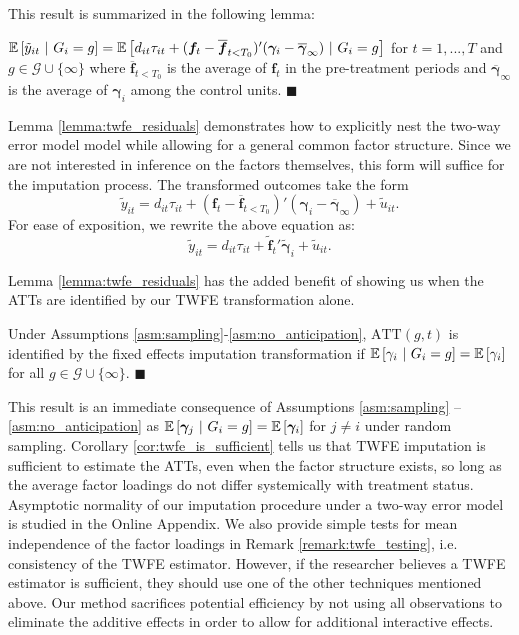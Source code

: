 \documentclass[12pt]{article}
\def\ATT{\text{ATT}}
\begin{document}
This result is summarized in the following lemma:
\begin{lemma}\label{lemma:twfe_residuals}
  $\mathbb{E}\left[\tilde{y}_{it} \ \vert \ G_i = g\right] = \mathbb{E}\left[d_{it}\tau_{it} + (\bm f_t - \overline{\bm f}_{t < T_0})' (\bm \gamma_i - \overline{\bm \gamma}_{\infty})  \ \vert \ G_i = g\right]$ for $t = 1,...,T$ and $g \in \mathcal{G} \cup \{ \infty \}$ where $\overline{\bm f}_{t < T_0}$ is the average of $\bm f_t$ in the pre-treatment periods and $\overline{\bm\gamma}_\infty$ is the average of $\bm \gamma_i$ among the control units. $\blacksquare$
\end{lemma}

Lemma \ref{lemma:twfe_residuals} demonstrates how to explicitly nest the two-way error model model while allowing for a general common factor structure. Since we are not interested in inference on the factors themselves, this form will suffice for the imputation process. The transformed outcomes take the form
\begin{equation}
  \tilde{y}_{it} = d_{it} \tau_{it} + (\bm f_t - \overline{\bm f}_{t < T_0})' (\bm \gamma_i - \overline{\bm \gamma}_\infty) + \tilde{u}_{it}.
\end{equation}
For ease of exposition, we rewrite the above equation as:
\begin{equation}
  \tilde{y}_{it} = d_{it} \tau_{it} + \tilde{\bm f}_t' \tilde{\bm \gamma}_i + \tilde{u}_{it}.
\end{equation}

Lemma \ref{lemma:twfe_residuals} has the added benefit of showing us when the ATTs are identified by our TWFE transformation alone.
\begin{cor}\label{cor:twfe_is_sufficient}
  Under Assumptions \ref{asm:sampling}-\ref{asm:no_anticipation}, $\ATT(g,t)$ is identified by the fixed effects imputation transformation if $\mathbb{E}\left[\gamma_i \ \vert \ G_i=g\right] = \mathbb{E}\left[\gamma_i\right]$ for all $g \in \mathcal{G} \cup \{\infty\}$. $\blacksquare$
\end{cor}
This result is an immediate consequence of Assumptions \ref{asm:sampling} -- \ref{asm:no_anticipation} as $\mathbb{E}\left[\bm \gamma_j \ \vert \ G_i = g\right] = \mathbb{E}\left[\bm \gamma_i\right]$ for $j \neq i$ under random sampling. 
Corollary \ref{cor:twfe_is_sufficient} tells us that TWFE imputation is sufficient to estimate the ATTs, even when the factor structure exists, so long as the average factor loadings do not differ systemically with treatment status. Asymptotic normality of our imputation procedure under a two-way error model is studied in the Online Appendix. We also provide simple tests for mean independence of the factor loadings in Remark \ref{remark:twfe_testing}, i.e. consistency of the TWFE estimator. However, if the researcher believes a TWFE estimator is sufficient, they should use one of the other techniques mentioned above. Our method sacrifices potential efficiency by not using all observations to eliminate the additive effects in order to allow for additional interactive effects.
\end{document}

